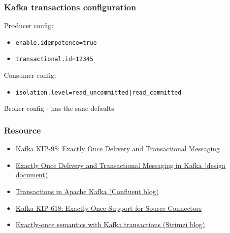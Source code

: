 \documentclass[10pt,utf8]{beamer}
\begin{document}
\begin{frame}
    \frametitle{Kafka transactions configuration}
    Producer config:
    \begin{itemize}
        \item \texttt{enable.idempotence=true}
        \item \texttt{transactional.id=12345}
    \end{itemize}
    \vspace{0.5cm}
    Consumer config:
    \begin{itemize}
     \item \texttt{isolation.level=read\_uncommitted|read\_committed}
    \end{itemize}
    \vspace{0.5cm}
    Broker config - has the sane defaults
\end{frame}

\begin{frame}
    \frametitle{Resource}
    \begin{itemize}
        \color{blue}
        \item \href{https://cwiki.apache.org/confluence/display/KAFKA/KIP-98+-+Exactly+Once+Delivery+and+Transactional+Messaging}{Kafka KIP-98: Exactly Once Delivery and Transactional Messaging}
        \item \href{https://docs.google.com/document/d/11Jqy\_GjUGtdXJK94XGsEIK7CP1SnQGdp2eF0wSw9ra8/edit\#heading=h.xq0ee1vnpz4o}{Exactly Once Delivery and Transactional Messaging in Kafka (design document)}
        \item \href{https://www.confluent.io/blog/transactions-apache-kafka/}{Transactions in Apache Kafka (Confluent blog)}
        \item \href{https://cwiki.apache.org/confluence/display/KAFKA/KIP-618\%3A+Exactly-Once+Support+for+Source+Connectors}{Kafka KIP-618: Exactly-Once Support for Source Connectors}
        \item \href{https://strimzi.io/blog/2023/05/03/kafka-transactions/}{Exactly-once semantics with Kafka transactions (Strimzi blog)}
        \color{black}
    \end{itemize}
\end{frame}



\end{document}
